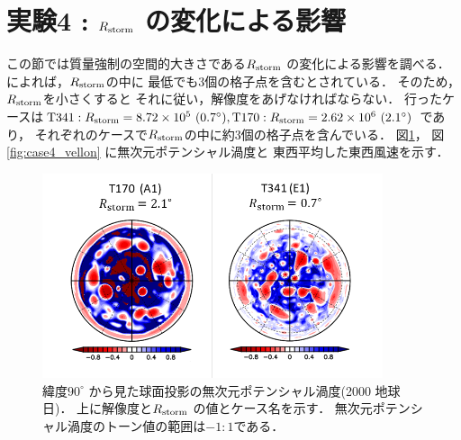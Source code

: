 \documentclass[a4j,12pt,openbib,oneside]{jreport}
\begin{document}
\section{実験4 : $R_{\rm{storm}}$ の変化による影響}
\label{sec:case4}
この節では質量強制の空間的大きさである$R_{\rm{storm}}$ の変化による影響を調べる．
\cite{Showman2007} によれば，$R_{\rm{storm}}$の中に
最低でも3個の格子点を含むとされている．
そのため，$R_{\rm{storm}}$を小さくすると
それに従い，解像度をあげなければならない．
行ったケースは${\rm{T341}} : R_{\rm{storm}} = 8.72 \times 10^5 ~(0.7^\circ), 
{\rm{T170}} : R_{\rm{storm}} = 2.62 \times 10^6 ~(2.1^\circ)$ であり，
それぞれのケースで$R_{\rm{storm}}$の中に約3個の格子点を含んでいる．
図\ref{fig:case4_nonqv}， 図\ref{fig:case4_vellon} に無次元ポテンシャル渦度と
東西平均した東西風速を示す．
%
%
%
%
%
\begin{figure}[ht]
  \begin{center}
    \includegraphics[clip,width=10cm]{./fig/result/case4/case4_nonqv.png}
    \caption{
      \footnotesize{緯度$90^\circ$ から見た球面投影の無次元ポテンシャル渦度(2000 地球日)．
上に解像度と$R_{\rm{storm}}$ の値とケース名を示す．
無次元ポテンシャル渦度のトーン値の範囲は$-1:1$である．
      }
    }
    \label{fig:case4_nonqv}
  \end{center}
\end{figure}
\end{document}
